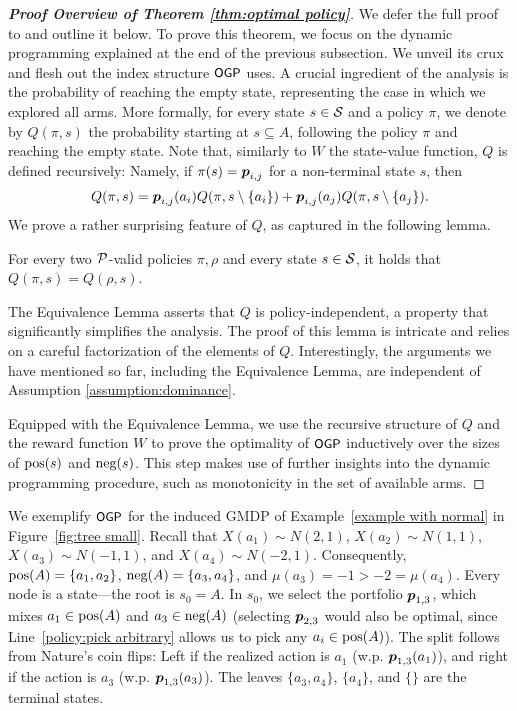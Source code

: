 \begin{proof}[\textnormal{\textbf{Proof Overview of Theorem \ref{thm:optimal policy}}}]
We defer the full proof to {\ifnum{}\fi} and outline it below.
To prove this theorem, we focus on the dynamic programming explained at the end of the previous subsection. We unveil its crux and flesh out the index structure ${\small\textnormal{\textsf{OGP}}}$ uses. A crucial ingredient of the analysis is the probability of reaching the empty state, representing the case in which we explored all arms. More formally, for every state $s\in \mathcal{S}$ and a policy $\pi$, we denote by $Q(\pi,s)$ the probability starting at $s\subseteq A$, following the policy $\pi$ and reaching the empty state. Note that, similarly to $W$ the state-value function, $Q$ is defined recursively: Namely, if $\pi(s)=\boldsymbol{ p }_{i,j}$ for a non-terminal state $s$, then \[ Q(\pi,s)=\boldsymbol{ p }_{i,j}(a_i)Q(\pi,s\setminus\{a_i\})+\boldsymbol{ p }_{i,j}(a_j)Q(\pi,s\setminus\{a_j\}). \]
We prove a rather surprising feature of $Q$, as captured in the following lemma.
\begin{lemma}\label{lemma:equivalence body}
For every two $\mathcal{P}$-valid policies $\pi,\rho$ and every state $s\in \mathcal{S}$, it holds that $Q(\pi,s)=Q(\rho,s)$.
\end{lemma}
The Equivalence Lemma asserts that $Q$ is policy-independent, a property that significantly simplifies the analysis. The proof of this lemma is intricate and relies on a careful factorization of the elements of $Q$.  Interestingly, the arguments we have mentioned so far, including the Equivalence Lemma, are independent of Assumption \ref{assumption:dominance}.

Equipped with the Equivalence Lemma, we use the recursive structure of $Q$ and the reward function $W$ to prove the optimality of ${\small\textnormal{\textsf{OGP}}}$ inductively over the sizes of $\textnormal{pos}(s)$ and $\textnormal{neg}(s)$. This step makes use of further insights into the dynamic programming procedure, such as monotonicity in the set of available arms.
\end{proof}

We exemplify ${\small\textnormal{\textsf{OGP}}}$ for the induced GMDP of Example~\ref{example with normal} in Figure~\ref{fig:tree small}. 
Recall that 
$X(a_1)\sim N(2,1)$, $X(a_2)\sim N(1,1)$, $X(a_3)\sim N(-1,1)$, and $X(a_4)\sim N(-2,1)$. Consequently, $\textnormal{pos}(A)=\{a_1,a_2\}$, $\textnormal{neg}(A)=\{a_3,a_4\}$, and $\mu(a_3)=-1 > -2=\mu(a_4)$. Every node is a state---the root is $s_0=A$. In $s_0$, we select the portfolio $\boldsymbol{ p }_{1,3}$, which mixes $a_1\in \textnormal{pos}(A)$ and $a_3 \in \textnormal{neg}(A)$ (selecting $\boldsymbol{ p }_{2,3}$ would also be optimal, since Line~\ref{policy:pick arbitrary} allows us to pick any $a_i\in\textnormal{pos}(A)$). The split follows from Nature's coin flips: Left if the realized action is $a_1$ (w.p. $\boldsymbol{ p }_{1,3}(a_1)$), and right if the action is $a_3$ (w.p. $\boldsymbol{ p }_{1,3}(a_3)$). The leaves $\{a_3,a_4\}$, $\{a_4\}$, and $\{\}$ are the terminal states. 


